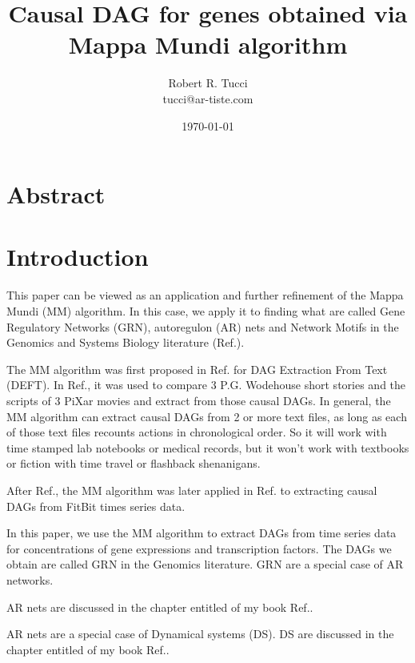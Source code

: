 \documentclass[12pt]{article}
\begin{document}
\title{Causal DAG for genes obtained via Mappa Mundi algorithm}
\date{ \today}
\author{Robert R. Tucci\\
        tucci@ar-tiste.com}
\maketitle
\vskip2cm
\section*{Abstract}

\section{Introduction}

This paper can be viewed
as an application and further refinement 
of the Mappa Mundi (MM) algorithm.  
In this case, we apply it to finding what
are called Gene Regulatory Networks (GRN),
autoregulon (AR) nets
and Network Motifs 
in the Genomics and Systems Biology literature (Ref.\cite{alon-book}).


The MM algorithm
was first proposed in Ref.\cite{mappa-mundi} 
for DAG Extraction From Text (DEFT). 
In Ref.\cite{mappa-mundi}, it was used to compare 3 P.G. Wodehouse short stories and the scripts of 3 PiXar movies
and extract from those causal DAGs.
In general, the MM algorithm can extract causal DAGs from 2 or more 
text files, as long as each of
those text files recounts actions 
in chronological order. So it will work with time stamped lab
notebooks or medical records, 
but it won't work with textbooks or fiction with  time travel or flashback shenanigans.

After Ref.\cite{mappa-mundi}, the MM algorithm was later applied in Ref.\cite{causal-fitbit} to extracting causal DAGs from FitBit times
series data.

In this paper, we use the MM algorithm
to extract DAGs from time series data for
concentrations of
gene expressions and transcription factors.
The DAGs we obtain are called GRN
in the Genomics literature. GRN are a
special case of AR networks.

AR nets are 
discussed in the chapter entitled  of 
my book Ref.\cite{Bayesuvius}.

AR nets are a special case of Dynamical systems (DS). DS are discussed in the
chapter entitled 
of my book Ref.\cite{Bayesuvius}.
\end{document}
